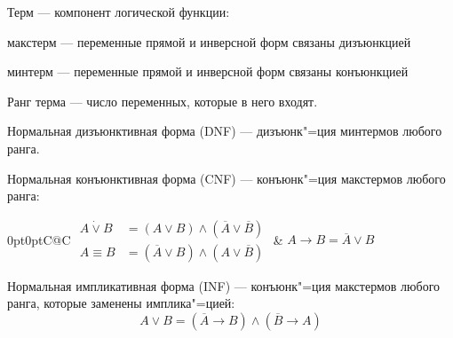 {\bold Терм} --- компонент логической функции:

\begin{list*}
\item{\bold макстерм} --- переменные прямой и инверсной форм связаны {\ital дизъюнкцией}
\item{\bold минтерм} --- переменные прямой и инверсной форм связаны {\ital конъюнкцией}
\end{list*}
{\bold Ранг} {\ital терма} --- число переменных, которые в него входят.

{\bold Нормальная дизъюнктивная форма} {\ital (DNF)} --- дизъюнк"=ция минтермов любого ранга.

{\bold Нормальная конъюнктивная форма} {\ital (CNF)} --- конъюнк"=ция макстермов любого ранга:
\begin{theorem}
\begin{tabularcx}{0pt}{0pt}{C@{\hspace*{-16pt}}C}{\textwidth}
$\begin{aligned}
A\dot{\lor}B&=(A\lor B)\land(\overline{A}\lor\overline{B})\\
A\equiv B&=(\overline{A}\lor B)\land(A\lor\overline{B})
\end{aligned}$\hspace*{-18pt} & $A\rightarrow B=\overline{A}\lor B$
\end{tabularcx}
\end{theorem}
{\bold Нормальная импликативная форма} {\ital (INF)} --- конъюнк"=ция макстермов любого ранга, которые заменены имплика"=цией:
$$A\lor B=(\overline{A}\rightarrow B)\land(\overline{B}\to A)$$
